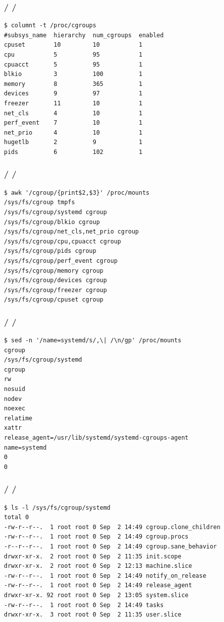 \documentclass{beamer}
\newcommand{\autotitle}
{\frametitle{
    \secname
    \ifx\insertsubsection\empty
    \else
        /\subsecname
        \ifx\insertsubsubsection\empty\else/\subsubsecname\fi
    \fi}}
\begin{document}
\begin{frame}[fragile]
    \autotitle
        \begin{verbatim}
$ columnt -t /proc/cgroups
#subsys_name  hierarchy  num_cgroups  enabled
cpuset        10         10           1
cpu           5          95           1
cpuacct       5          95           1
blkio         3          100          1
memory        8          365          1
devices       9          97           1
freezer       11         10           1
net_cls       4          10           1
perf_event    7          10           1
net_prio      4          10           1
hugetlb       2          9            1
pids          6          102          1
    \end{verbatim}
\end{frame}

\begin{frame}[fragile]
    \autotitle
    \begin{verbatim}
$ awk '/cgroup/{print$2,$3}' /proc/mounts
/sys/fs/cgroup tmpfs
/sys/fs/cgroup/systemd cgroup
/sys/fs/cgroup/blkio cgroup
/sys/fs/cgroup/net_cls,net_prio cgroup
/sys/fs/cgroup/cpu,cpuacct cgroup
/sys/fs/cgroup/pids cgroup
/sys/fs/cgroup/perf_event cgroup
/sys/fs/cgroup/memory cgroup
/sys/fs/cgroup/devices cgroup
/sys/fs/cgroup/freezer cgroup
/sys/fs/cgroup/cpuset cgroup
    \end{verbatim}
\end{frame}

\begin{frame}[fragile]
    \autotitle
    \begin{verbatim}
$ sed -n '/name=systemd/s/,\| /\n/gp' /proc/mounts
cgroup
/sys/fs/cgroup/systemd
cgroup
rw
nosuid
nodev
noexec
relatime
xattr
release_agent=/usr/lib/systemd/systemd-cgroups-agent
name=systemd
0
0
    \end{verbatim}
\end{frame}

\begin{frame}[fragile]
    \autotitle
    \begin{verbatim}
$ ls -l /sys/fs/cgroup/systemd
total 0
-rw-r--r--.  1 root root 0 Sep  2 14:49 cgroup.clone_children
-rw-r--r--.  1 root root 0 Sep  2 14:49 cgroup.procs
-r--r--r--.  1 root root 0 Sep  2 14:49 cgroup.sane_behavior
drwxr-xr-x.  2 root root 0 Sep  2 11:35 init.scope
drwxr-xr-x.  2 root root 0 Sep  2 12:13 machine.slice
-rw-r--r--.  1 root root 0 Sep  2 14:49 notify_on_release
-rw-r--r--.  1 root root 0 Sep  2 14:49 release_agent
drwxr-xr-x. 92 root root 0 Sep  2 13:05 system.slice
-rw-r--r--.  1 root root 0 Sep  2 14:49 tasks
drwxr-xr-x.  3 root root 0 Sep  2 11:35 user.slice
    \end{verbatim}
\end{frame}
\end{document}
